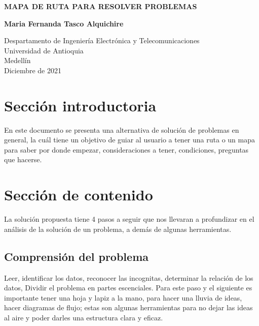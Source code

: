 \documentclass{article}
\begin{document}
\begin{titlepage}
    \begin{center}
        \vspace*{1cm}
            
        \Huge
        \textbf{MAPA DE RUTA PARA RESOLVER PROBLEMAS}
            
        \vspace{0.5cm}
        \LARGE
        
            
        \vspace{5cm}
            
        \textbf{Maria Fernanda Tasco Alquichire}
            
        \vfill
            
        \vspace{0.8cm}
            
        \Large
        Despartamento de Ingeniería Electrónica y Telecomunicaciones\\
        Universidad de Antioquia\\
        Medellín\\
        Diciembre de 2021
            
    \end{center}
\end{titlepage}

\tableofcontents
\newpage
\section{Sección introductoria}\label{intro}
En este documento se presenta una alternativa de solución de problemas en general, la cuál tiene un objetivo de guiar al usuario a tener una ruta o un mapa para saber por donde empezar, consideraciones a tener, condiciones, preguntas que hacerse.

\section{Sección de contenido} \label{contenido}
La solución propuesta tiene 4 pasos a seguir que nos llevaran a profundizar en el análisis de la solución de un problema, a demás de algunas herramientas.
\subsection{Comprensión del problema}
Leer, identificar los datos, reconocer las incognitas, determinar la relación de los datos, Dividir el problema en partes escenciales. Para este paso y el siguiente es importante tener una hoja y lapiz a la mano, para hacer una lluvia de ideas, hacer diagramas de flujo; estas son algunas herramientas para no dejar las ideas al aire y poder darles una estructura clara y eficaz.
\end{document}
